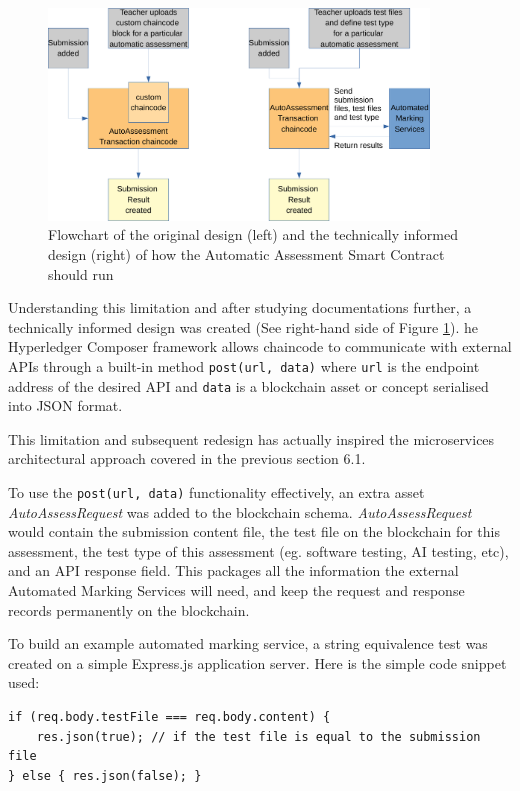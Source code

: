 \begin{figure}[!ht]
	\centering
	\includegraphics[width=0.9\textwidth]{automarkinglim}
	\caption[AutoAssessment Smart Contract Design Change]
	{Flowchart of the original design (left) and the technically informed design (right) of how the Automatic Assessment Smart Contract should run}
	\label{fig:automarkinglim}
\end{figure}

Understanding this limitation and after studying documentations further, a technically informed design was created
(See right-hand side of Figure \ref{fig:automarkinglim}). he Hyperledger Composer framework allows chaincode
to communicate with external APIs through a built-in method \texttt{post(url, data)} where \texttt{url} is
the endpoint address of the desired API and \texttt{data} is a blockchain asset or concept serialised into JSON format.

This limitation and subsequent redesign has actually inspired the microservices architectural approach covered in the previous section 6.1.

To use the \texttt{post(url, data)} functionality effectively, an extra asset \textit{AutoAssessRequest} was added to the blockchain schema.
\textit{AutoAssessRequest} would contain the submission content file, the test file on the blockchain for this assessment, the test type of
this assessment (eg. software testing, AI testing, etc), and an API response field. This packages all the information the external
Automated Marking Services will need, and keep the request and response records permanently on the blockchain.

To build an example automated marking service, a string equivalence test was created on a simple Express.js application server.
Here is the simple code snippet used:
\begin{verbatim}
if (req.body.testFile === req.body.content) {
    res.json(true); // if the test file is equal to the submission file
} else { res.json(false); } 
\end{verbatim}

